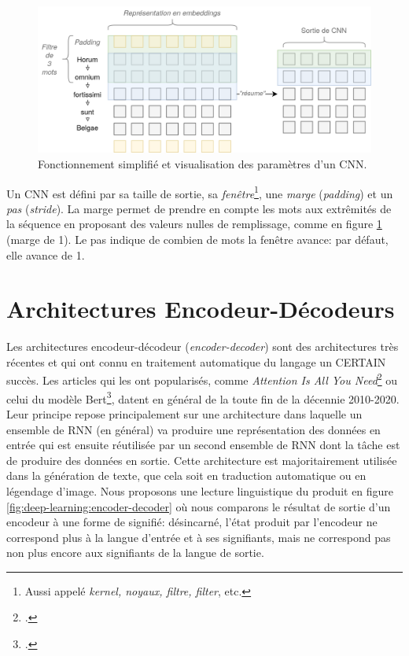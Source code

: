 \begin{figure}[h]
    \centering
    \includegraphics[width=\linewidth]{figures/chap2/CNN.png}
    \caption{Fonctionnement simplifié et visualisation des paramètres d'un CNN.}
    \label{fig:deep-learning:cnn-tal}
\end{figure}

Un CNN est défini par sa taille de sortie, sa \textit{fenêtre}\footnote{Aussi appelé \textit{kernel, noyaux, filtre, filter}, etc.}, une \textit{marge} (\textit{padding}) et un \textit{pas} (\textit{stride}). La marge permet de prendre en compte les mots aux extrêmités de la séquence en proposant des valeurs nulles de remplissage, comme en figure \ref{fig:deep-learning:cnn-tal} (marge de 1). Le pas indique de combien de mots la fenêtre avance: par défaut, elle avance de 1. 

\section{Architectures Encodeur-Décodeurs}
\label{deep-learning:encoder-decoder}

Les architectures encodeur-décodeur (\textit{encoder-decoder}) sont des architectures très récentes et qui ont connu en traitement automatique du langage un CERTAIN succès. Les articles qui les ont popularisés, comme \textit{Attention Is All You Need}\footcite{vaswani_attention_2017} ou celui du modèle Bert\footcite{devlin_bert_2019}, datent en général de la toute fin de la décennie 2010-2020. Leur principe repose principalement sur une architecture dans laquelle un ensemble de RNN (en général) va produire une représentation des données en entrée qui est ensuite réutilisée par un second ensemble de RNN dont la tâche est de produire des données en sortie. Cette architecture est majoritairement utilisée dans la génération de texte, que cela soit en traduction automatique ou en légendage d'image. Nous proposons une lecture linguistique du produit en figure \ref{fig:deep-learning:encoder-decoder} où nous comparons le résultat de sortie d'un encodeur à une forme de signifié: désincarné, l'état produit par l'encodeur ne correspond plus à la langue d'entrée et à ses signifiants, mais ne correspond pas non plus encore aux signifiants de la langue de sortie.

